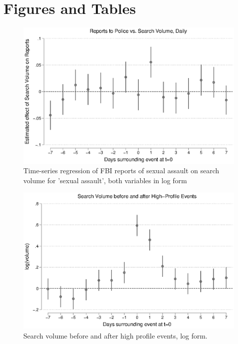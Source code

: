\documentclass[AER,draftmode]{AEA}
\begin{document}
\clearpage
\section{Figures and Tables}

\begin{figure}
\includegraphics[width=\linewidth]{figures/police_trend_daily_logboth.eps}
\caption{Time-series regression of FBI reports of sexual assault on search volume for 'sexual assault', both variables in log form} \label{figure:police_trends_daily_logboth}
\end{figure}

\begin{figure}
\includegraphics[width=\linewidth]{figures/events_trend.eps}
\caption{Search volume before and after high profile events, log form.} \label{figure:events_trend}
\end{figure}
\end{document}
